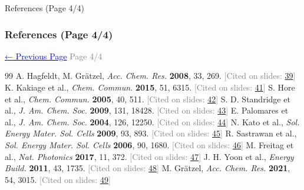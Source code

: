 \documentclass[aspectratio=169]{beamer}
\begin{document}
\begin{frame}[allowframebreaks]{References (Page 4/4)}
\frametitle{References (Page 4/4)}
\vspace{0.5em}\begin{center}\hyperlink{page.3}{\textcolor{blue}{\small ← Previous Page}} \hfill \textcolor{gray}{\small Page 4/4}\end{center}

\begin{thebibliography}{99}
 A. Hagfeldt, M. Grätzel, \textit{Acc. Chem. Res.} \textbf{2008}, 33, 269. \hfill\textcolor{gray}{\tiny [Cited on slides: \hyperlink{page.39}{39}]}
 K. Kakiage et al., \textit{Chem. Commun.} \textbf{2015}, 51, 6315. \hfill\textcolor{gray}{\tiny [Cited on slides: \hyperlink{page.41}{41}]}
 S. Hore et al., \textit{Chem. Commun.} \textbf{2005}, 40, 511. \hfill\textcolor{gray}{\tiny [Cited on slides: \hyperlink{page.42}{42}]}
 S. D. Standridge et al., \textit{J. Am. Chem. Soc.} \textbf{2009}, 131, 18428. \hfill\textcolor{gray}{\tiny [Cited on slides: \hyperlink{page.43}{43}]}
 E. Palomares et al., \textit{J. Am. Chem. Soc.} \textbf{2004}, 126, 12250. \hfill\textcolor{gray}{\tiny [Cited on slides: \hyperlink{page.44}{44}]}
 N. Kato et al., \textit{Sol. Energy Mater. Sol. Cells} \textbf{2009}, 93, 893. \hfill\textcolor{gray}{\tiny [Cited on slides: \hyperlink{page.45}{45}]}
 R. Sastrawan et al., \textit{Sol. Energy Mater. Sol. Cells} \textbf{2006}, 90, 1680. \hfill\textcolor{gray}{\tiny [Cited on slides: \hyperlink{page.46}{46}]}
 M. Freitag et al., \textit{Nat. Photonics} \textbf{2017}, 11, 372. \hfill\textcolor{gray}{\tiny [Cited on slides: \hyperlink{page.47}{47}]}
 J. H. Yoon et al., \textit{Energy Build.} \textbf{2011}, 43, 1735. \hfill\textcolor{gray}{\tiny [Cited on slides: \hyperlink{page.48}{48}]}
 M. Grätzel, \textit{Acc. Chem. Res.} \textbf{2021}, 54, 3015. \hfill\textcolor{gray}{\tiny [Cited on slides: \hyperlink{page.49}{49}]}
\end{thebibliography}
\end{frame}
\end{document}
